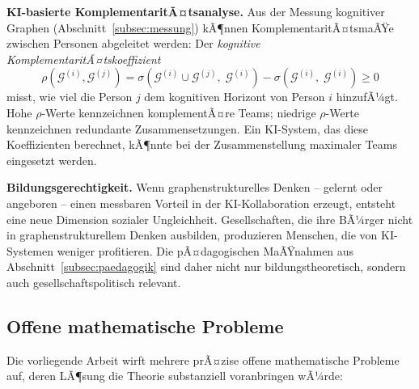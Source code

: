 ﻿\documentclass[12pt,a4paper]{article}
\theoremstyle{plain}
\theoremstyle{definition}
\theoremstyle{remark}
\newcommand{\GG}{\mathcal{G}}
\begin{document}
\textbf{KI-basierte KomplementaritÃ¤tsanalyse.} Aus der Messung kognitiver Graphen (Abschnitt~\ref{subsec:messung}) kÃ¶nnen KomplementaritÃ¤tsmaÃŸe zwischen Personen abgeleitet werden: Der \emph{kognitive KomplementaritÃ¤tskoeffizient}
\[
  \rho(\GG^{(i)}, \GG^{(j)}) = \sigma\!\left(\GG^{(i)} \cup \GG^{(j)},\; \GG^{(i)}\right) - \sigma\!\left(\GG^{(i)},\; \GG^{(i)}\right) \geq 0
\]
misst, wie viel die Person $j$ dem kognitiven Horizont von Person $i$ hinzufÃ¼gt. Hohe $\rho$-Werte kennzeichnen komplementÃ¤re Teams; niedrige $\rho$-Werte kennzeichnen redundante Zusammensetzungen. Ein KI-System, das diese Koeffizienten berechnet, kÃ¶nnte bei der Zusammenstellung maximaler Teams eingesetzt werden.

\textbf{Bildungsgerechtigkeit.} Wenn graphenstrukturelles Denken -- gelernt oder angeboren -- einen messbaren Vorteil in der KI-Kollaboration erzeugt, entsteht eine neue Dimension sozialer Ungleichheit. Gesellschaften, die ihre BÃ¼rger nicht in graphenstrukturellem Denken ausbilden, produzieren Menschen, die von KI-Systemen weniger profitieren. Die pÃ¤dagogischen MaÃŸnahmen aus Abschnitt~\ref{subsec:paedagogik} sind daher nicht nur bildungstheoretisch, sondern auch gesellschaftspolitisch relevant.

\subsection{Offene mathematische Probleme}
\label{subsec:offen}

Die vorliegende Arbeit wirft mehrere prÃ¤zise offene mathematische Probleme auf, deren LÃ¶sung die Theorie substanziell voranbringen wÃ¼rde:
\end{document}
